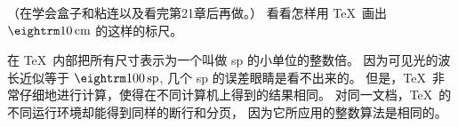 \dangerexercise （在学会盒子和粘连以及看完第21章后再做。）
看看怎样用 \TeX\ 画出 $\rm10\,cm$ 的这样的标尺。

\danger 在 \TeX\ 内部把所有尺寸表示为一个叫做 sp 的小单位的整数倍。%
因为可见光的波长近似等于 $\rm100\,sp$, 几个 sp 的误差眼睛是看不出来的。%
但是，\TeX\ 非常仔细地进行计算，使得在不同计算机上得到的结果相同。%
对同一文档，\TeX\ 的不同运行环境却能得到同样的断行和分页，
因为它所应用的整数算法是\hbox{相同的。}

